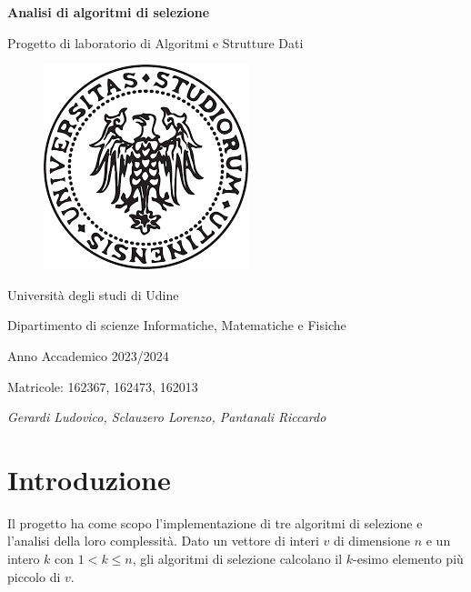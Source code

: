 \documentclass[a4paper]{article}
\begin{document}
\begin{titlepage} %
    \begin{center}
        \vspace*{1cm}
        {\Huge\bfseries Analisi di algoritmi di selezione\par}
        \vspace{.5cm}
        {\LARGE Progetto di laboratorio di Algoritmi e Strutture Dati\par}
        \vspace{1cm}
        \begin{figure}[h]
            \centering
            \includegraphics[width=.5\textwidth]{photo/uniud_logo.png}
        \end{figure}
        \vspace{1.5cm}
        {\LARGE Università degli studi di Udine\par}
        {\LARGE Dipartimento di scienze Informatiche, Matematiche e Fisiche\par}
        \vfill
        {\Large Anno Accademico 2023/2024\par}
        {\Large Matricole: 162367, 162473, 162013\par}
        {\Large\itshape Gerardi Ludovico, Sclauzero Lorenzo, Pantanali Riccardo\par}
    \end{center}
\end{titlepage}



\section{Introduzione}
Il progetto ha come scopo l'implementazione di tre algoritmi di selezione e l'analisi della loro complessità. 
Dato un vettore di interi $v$ di dimensione $n$ e un intero $k$ con $1 < k \le n$, gli algoritmi di selezione calcolano il $k$-esimo elemento più piccolo di $v$.
\end{document}
